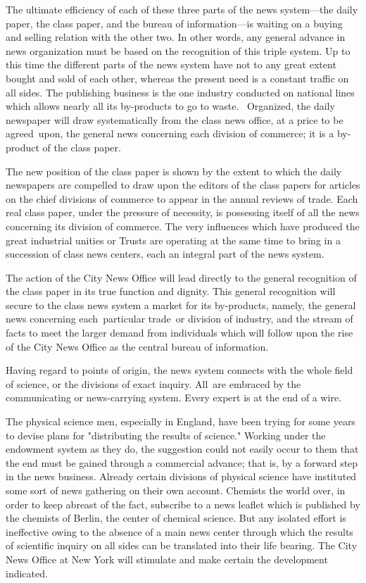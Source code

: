 \documentclass[openany,nobib]{tufte-book}
\begin{document}
The ultimate efficiency of each of these three parts of the news
system---the daily paper, the class paper, and the bureau of
information---is waiting on a buying and selling relation with the other
two. In other words, any general advance in news organization must be
based on the recognition of this triple system. Up to this time the
different parts of the news system have not to any great extent bought
and sold of each other, whereas the present need is a constant traffic
on all sides. The publishing business is the one industry conducted on
national lines which allows nearly all its by-products to go to waste.~
Organized, the daily newspaper will draw systematically from the class
news office, at a price to be agreed~upon, the general news concerning
each division of commerce; it is a by-product of the class paper.~

The new position of the class paper is shown by the extent to which the
daily newspapers are compelled to draw upon the editors of the class
papers for articles on the chief divisions of commerce to appear in the
annual reviews of trade. Each real class paper, under the pressure of
necessity, is possessing itself of all the news concerning its division
of commerce. The very influences which have produced the great
industrial unities or Trusts are operating at the same time to bring in
a succession of class news centers, each an integral part of the news
system.~

The action of the City News Office will lead directly to the general
recognition of the class paper in its true function and dignity. This
general recognition will secure to the class news system a market for
its by-products, namely, the general news concerning each~particular
trade~or division of industry, and the stream of facts to meet the
larger demand from individuals which will follow upon the rise of the
City News Office as the central bureau of information.~

Having regard to points of origin, the news system connects with the
whole field of science, or the divisions of exact inquiry. All~are
embraced by the communicating or news-carrying system. Every expert is
at the end of a wire.~

The physical science men, especially in England, have been trying for
some years to devise plans for "distributing the results of science."
Working under the endowment system as they do, the suggestion could not
easily occur to them that the end must be gained through a commercial
advance; that is, by a forward step in the news business. Already
certain divisions of physical science have instituted some sort of news
gathering on their own account. Chemists the world over, in order to
keep abreast of the fact, subscribe to a news leaflet which is published
by the chemists of Berlin, the center of chemical science. But any
isolated effort is ineffective owing to the absence of a main news
center through which the results of scientific inquiry on all sides can
be translated into their life bearing. The City News Office at New York
will stimulate and make certain the development indicated.~
\end{document}
